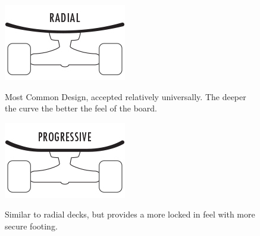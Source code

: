 \documentclass[titlepage, letterpaper,12pt]{article}
\begin{document}
\begin{itemize}

\begin{figure}[!htbp]\centering

\begin{minipage}{.5\textwidth}\centering
\includegraphics[width=.8\textwidth]{radial.jpg}
\label{radial}
\end{minipage}
\item Most Common Design, accepted relatively universally. The deeper the curve the better the feel of the board.
\end{figure}

\begin{figure}[!htbp]\centering
\begin{minipage}{.5\textwidth}\centering
\includegraphics[width=.8\textwidth]{progressive.jpg}
\label{progressive}
\end{minipage}
\item Similar to radial decks, but provides a more locked in feel with more secure footing.
\end{figure}


\end{itemize}
\end{document}
